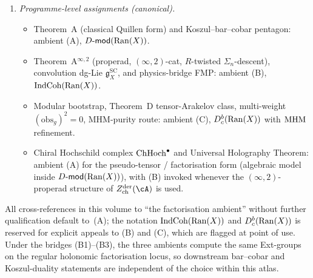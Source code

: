 \begin{remark}
\begin{enumerate}[label=\textup{(\Alph*)}]
\begin{enumerate}[label=\textup{(B\arabic*)}]
 on the bounded holonomic / factorisation sub-category:
 the Gaitsgory equivalence
 $\Dmod(Y)^{\mathrm{hol},\mathrm{bdd}} \simeq
 \IndCoh(Y_{\mathrm{dR}})^{\mathrm{compat}}$
 restricts to factorisation objects compatibly with the
 star-tensor; on this locus (A) and (B) compute the same
 Ext-groups, and the bar complex of (A) agrees with its
 $\IndCoh$-bar of (B) up to the canonical bounded-holonomic
 embedding.
 \item $D^b_c(\Ran(X)) \hookrightarrow \Dmod(\Ran(X))$ via
 Riemann--Hilbert: regular holonomic $D$-modules with
 de Rham filtration. Modular-bootstrap constructible
 sheaves lift uniquely to regular holonomic factorisation
 $D$-modules, thereby transporting weight data into
 ambient~(A) when needed.
 \item The three bridges assemble into a commutative triangle
 of $(\infty,1)$-functors after restriction to the regular
 holonomic factorisation locus, on which (A), (B), (C)
 compute the same cohomological invariants.
 \end{enumerate}
\item \emph{Programme-level assignments (canonical).}
 \begin{itemize}
 \item Theorem~A (classical Quillen form) and
 Koszul--bar--cobar pentagon: ambient (A),
 $D\text{-}\mathsf{mod}(\mathrm{Ran}(X))$.
 \item Theorem~A${}^{\infty,2}$ (properad, $(\infty,2)$-cat,
 $R$-twisted $\Sigma_n$-descent), convolution dg-Lie
 $\mathfrak g^{\mathrm{SC}}_X$, and physics-bridge FMP:
 ambient (B), $\operatorname{IndCoh}(\mathrm{Ran}(X))$.
 \item Modular bootstrap, Theorem~D tensor-Arakelov class,
 multi-weight $(\mathrm{obs}_g)^2 = 0$, MHM-purity route:
 ambient (C), $D^b_c(\mathrm{Ran}(X))$ with $\mathrm{MHM}$ refinement.
 \item Chiral Hochschild complex $\mathrm{Ch}\mathrm{Hoch}^\bullet$ and
 Universal Holography Theorem: ambient (A) for the
 pseudo-tensor / factorisation form (algebraic model
 inside $D\text{-}\mathsf{mod}(\mathrm{Ran}(X))$), with (B) invoked whenever the
 $(\infty,2)$-properad structure of
 $Z^{\mathrm{der}}_{\mathrm{ch}}(\cA)$ is used.
 \end{itemize}
\end{enumerate}
All cross-references in this volume to ``the factorisation ambient''
without further qualification default to~(A); the notation
$\operatorname{IndCoh}(\mathrm{Ran}(X))$ and $D^b_c(\mathrm{Ran}(X))$ is reserved for explicit
appeals to (B) and (C), which are flagged at point of use. Under the
bridges (B1)--(B3), the three ambients compute the same Ext-groups
on the regular holonomic factorisation locus, so downstream bar--cobar
and Koszul-duality statements are independent of the choice within
this atlas.
\end{remark}

